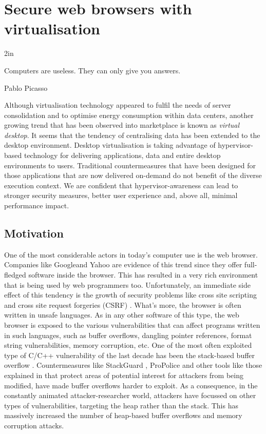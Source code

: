 \chapter{Secure web browsers with virtualisation}\label{bubble}

\epigraph{2in}{Computers are useless. They can only give you answers.}{Pablo Picasso}{}


Although virtualisation technology appeared to fulfil the needs of server consolidation and to optimise energy consumption within data centers, another growing trend that has been observed into marketplace is known as \emph{virtual desktop}.
It seems that the tendency of centralising data has been extended to the desktop environment. Desktop virtualisation is taking advantage of hypervisor-based technology for delivering applications, data and entire desktop environments to users. 
Traditional countermeasures that have been designed for those applications that are now delivered on-demand do not benefit of the diverse execution context. 
We are confident that hypervisor-awareness can lead to stronger security measures, better user experience and, above all, minimal performance impact.

\section{Motivation}
One of the most considerable actors in today's computer use is the web browser. Companies like Google\texttrademark and Yahoo are evidence of this trend since they offer full-fledged software inside the browser. 
This has resulted in a very rich environment that is being used by web programmers too. Unfortunately, an immediate side effect of this tendency is the growth of security problems like cross site scripting and cross site request forgeries (CSRF) \cite{xss,csrf,csrf2}. 
What's more, the browser is often written in unsafe languages. As in any other software of this type, the web browser is exposed to the various vulnerabilities that can affect programs written in such languages, such as buffer overflows, dangling pointer references, format string vulnerabilities, memory corruption, etc.
One of the most often exploited type of C/C++ vulnerability of the last decade has been the stack-based buffer overflow \cite{dalton2008real}. Countermeasures like StackGuard \cite{Wagle:2003:SGS}, ProPolice \cite{Etoh:2000:PSS} and other tools like those explained in \cite{dep, wilander2003comparison} that protect areas of potential interest for attackers from being modified, have made buffer overflows harder to exploit. 
As a consequence, in the constantly animated attacker-researcher world, attackers have focussed on other types of vulnerabilities, targeting the heap rather than the stack. 
This has massively increased the number of heap-based buffer overflows and memory corruption attacks.

